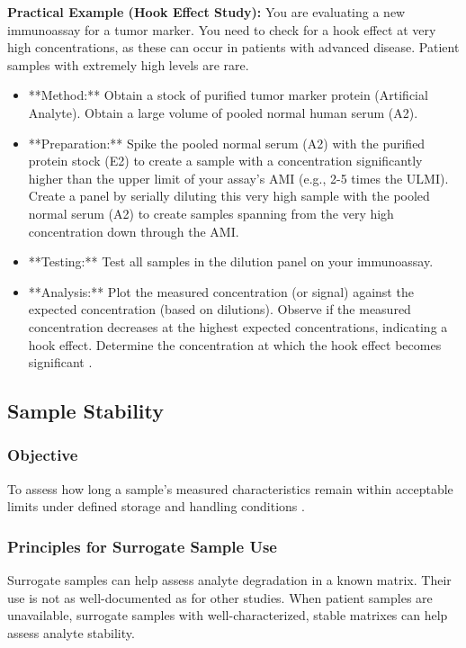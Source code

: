 \documentclass{article}
\begin{document}
\textbf{Practical Example (Hook Effect Study):}
You are evaluating a new immunoassay for a tumor marker. You need to check for a hook effect at very high concentrations, as these can occur in patients with advanced disease. Patient samples with extremely high levels are rare.
\begin{itemize}
    \item **Method:** Obtain a stock of purified tumor marker protein (Artificial Analyte). Obtain a large volume of pooled normal human serum (A2).
    \item **Preparation:** Spike the pooled normal serum (A2) with the purified protein stock (E2) to create a sample with a concentration significantly higher than the upper limit of your assay's AMI (e.g., 2-5 times the ULMI). Create a panel by serially diluting this very high sample with the pooled normal serum (A2) to create samples spanning from the very high concentration down through the AMI.
    \item **Testing:** Test all samples in the dilution panel on your immunoassay.
    \item **Analysis:** Plot the measured concentration (or signal) against the expected concentration (based on dilutions). Observe if the measured concentration decreases at the highest expected concentrations, indicating a hook effect. Determine the concentration at which the hook effect becomes significant \cite{CLSIEP34}.
\end{itemize}

\subsection{Sample Stability}

\subsubsection{Objective}
To assess how long a sample's measured characteristics remain within acceptable limits under defined storage and handling conditions \cite{CLSIEP35, CLSIEP25}.

\subsubsection{Principles for Surrogate Sample Use}
Surrogate samples can help assess analyte degradation in a known matrix. Their use is not as well-documented as for other studies. When patient samples are unavailable, surrogate samples with well-characterized, stable matrixes can help assess analyte stability.
\end{document}
